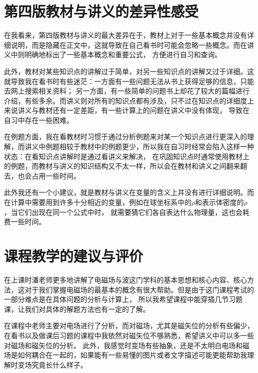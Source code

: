 \documentclass[a4paper]{article}
\begin{document}
	\section{第四版教材与讲义的差异性感受}
		在我看来，第四版教材与讲义的最大差异在于，教材上对于一些基本概念并没有详细说明，而是隐藏在正文中，这就导致在自己看书时可能会忽略一些概念。而在讲义中则明确地标出了一些基本概念和重要公式，
		方便进行自习和查询。\par
		此外，教材对某些知识点的讲解过于简单，对另一些知识点的讲解又过于详细。这就导致我在看书时有些迷茫：一方面有一些问题无法从书上获得足够的信息，只能去网上搜索相关资料；
		另一方面，有一些简单的问题书上却花了较大的篇幅进行介绍，有些多余。而讲义则对所有的知识点都有涉及，只不过在知识点的详细度上来说讲义与教材还有一定差距，有一些计算上的问题在讲义中没有体现，
		导致在自习中存在一些困难。\par
		在例题方面，我在看教材时习惯于通过分析例题来对某一个知识点进行更深入的理解，而讲义中例题相较于教材中的例题更少，所以我在自习时经常会陷入这样一种状态：在看知识点讲解时是通过看讲义来解决，
		在巩固知识点时通常使用教材上的例题，而教材与讲义的知识结构又不太一样，所以会在教材和讲义之间翻来翻去，也会占用一些时间。\par
		此外我还有一个小建议，就是教材与讲义在变量的含义上并没有进行详细说明。而在计算中需要用到许多十分相近的变量，例如在球坐标系中的$\rho$和表示体密度的$\rho$，当它们出现在同一个公式中时，
		就需要猜它们各自表达什么物理量，这也会耗费一些时间。
	\section{课程教学的建议与评价}
		在上课时潘老师更多地讲解了电磁场与波这门学科的基本思想和核心内容、核心方法，这对于我们掌握电磁场的最基本的概念有很大帮助。但是由于这门课程考试的一部分难点是在具体问题的分析与计算上，
		所以我希望课程中能穿插几节习题课，让我们对具体的解题方法也有一定的了解。\par
		在课程中老师主要对电场进行了分析，而对磁场，尤其是磁矢位的分析有些偏少，在看书以及做课后习题的课程中我依然对磁矢位不够熟悉，希望讲义中可以多一些对磁场和磁矢位的分析。
		此外，我感觉时变场有些抽象，还是不太明白电场和磁场是如何耦合在一起的，如果能有一些易懂的图片或者文字描述可能更能帮助我理解时变场究竟长什么样子。
\end{document}
